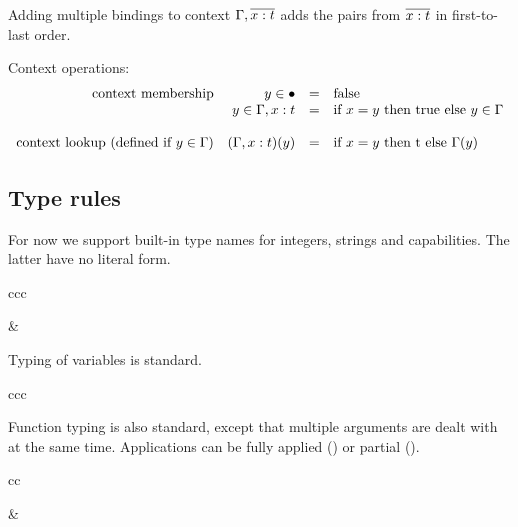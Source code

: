 \documentclass[11pt]{article}
\begin{document}
Adding multiple bindings to context $\Gamma,\overline{x : t}$ adds the pairs from $\overline{x : t}$ in first-to-last order.

Context operations:
\[
\begin{array}{rrcll}
\text{context membership}
  & y \in \bullet                      & = & \text{false} \\
  & y \in \Gamma,x : t & = & \text{if $x = y$ then true else $y \in \Gamma$} \\
\\
\text{context lookup (defined if $y \in \Gamma$)}
  & (\Gamma,x : t)(y) & = & \text{if $x = y$ then t else $\Gamma(y)$} \\
\end{array}
\]

\subsection{Type rules}

For now we support built-in type names for integers, strings and capabilities.
The latter have no literal form.

\begin{rules}{ccc}


&


\end{rules}

Typing of variables is standard.

\begin{rules}{ccc}


\end{rules}

Function typing is also standard, except that multiple arguments are dealt with at the same time.
Applications can be fully applied () or partial ().

\begin{rules}{cc}

\inference[T-FUN]{
  \infe{\consc{\Gamma}{\bnds{x}{t}}}{e}{t}
}{
  \infe{\Gamma}{\fune{\repo{\arge{x}{t}}}{e}}{\funty{\repo{t}}{t}}
}

&


\end{rules}
\end{document}
